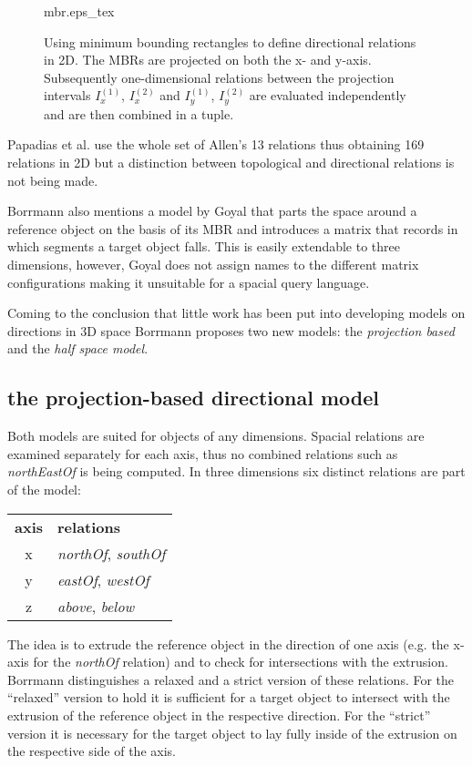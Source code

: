\documentclass[paper=a4, fontsize=11pt]{scrartcl} %
\numberwithin{equation}{section} %
\numberwithin{figure}{section} %
\numberwithin{table}{section} %
\begin{document}
\begin{figure}
  \centering
  \def\svgwidth{20em}
  {mbr.eps_tex}
  \caption{Using minimum bounding rectangles to define directional relations in 2D. The MBRs are projected on both the x- and y-axis. Subsequently one-dimensional relations between the projection intervals $I^{(1)}_x$, $I^{(2)}_x$  and $I^{(1)}_y$, $I^{(2)}_y$ are evaluated independently and are then combined in a tuple.}
\label{fig:mbr}
\end{figure}

Papadias et al. \cite{papadias1995topological} use the whole set of Allen's 13 relations thus obtaining 169 relations in 2D but a distinction between topological and directional relations is not being made. 

Borrmann also mentions a model by Goyal \cite{goyal2000similarity} that parts the space around a reference object on the basis of its MBR and introduces a matrix that records in which segments a target object falls. This is easily extendable to three dimensions, however, Goyal does not assign names to the different matrix configurations making it unsuitable for a spacial query language.  

Coming to the conclusion that little work has been put into developing models on directions in 3D space Borrmann \cite{Borrmann:2009:AEI} proposes two new models:  the \textit{projection based} and the \textit{half space model}. 


\subsection{the projection-based directional model}
Both models are suited for objects of any dimensions. Spacial relations are examined separately for each axis, thus no combined relations such as \emph{northEastOf} is being computed. In three dimensions six distinct relations are part of the model:
\begin{table}[h!]
  \begin{tabular}{cl}
   \textbf{axis} & \textbf{relations} \\
    x  & \emph{northOf}, \emph{southOf} \\
    y  & \emph{eastOf}, \emph{westOf} \\
    z  & \emph{above}, \emph{below}
  \end{tabular}
\end{table}

The idea is to extrude the reference object in the direction of one axis (e.g. the x-axis for the \emph{northOf} relation) and to check for intersections with the extrusion. Borrmann distinguishes a relaxed and a strict version of these relations. For the ``relaxed'' version to hold it is sufficient for a target object to intersect with the extrusion of the reference object in the respective direction. For the ``strict'' version it is necessary for the target object to lay fully inside of the extrusion on the respective side of the axis. 
\end{document}
